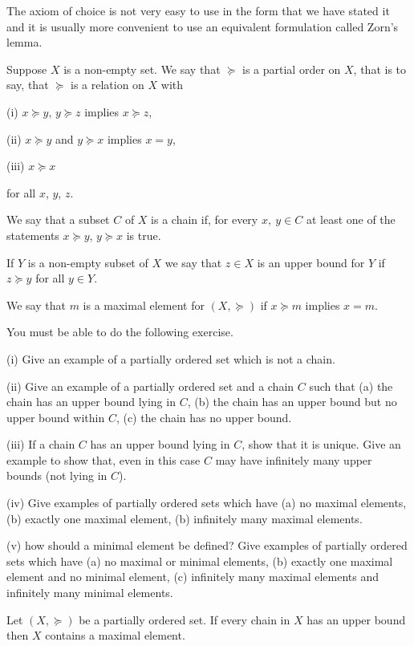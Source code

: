The axiom of choice is not very easy to use in the form
that we have stated it and it is usually more convenient
to use an equivalent formulation called Zorn's lemma.
\begin{definition} Suppose $X$ is a non-empty set.
We say that
$\succeq$ is a partial order on $X$, that is to say,
that $\succeq$ is a relation on $X$ with

(i) $x\succeq y$, $y\succeq z$ implies $x\succeq z$,

(ii) $x\succeq y$ and $y\succeq x$ implies $x=y$,

(iii) $x\succeq x$

\noindent for all $x$, $y$, $z$.

We say that a subset $C$ of $X$ is a chain
if, for every $x,\ y\in C$ at least one of
the statements $x\succeq y$, $y\succeq x$ is true.

If $Y$ is a non-empty subset of $X$ we say that $z\in X$
is an upper bound for $Y$ if $z\succeq y$ for all $y\in Y$.

We say that $m$ is a maximal element for $(X,\succeq)$
if $x\succeq m$ implies $x=m$.
\end{definition}
You must be able to do the following exercise.
\begin{exercise} (i) Give an example of a partially
ordered set which is not a chain.

(ii) Give an example of a partially ordered set
and a chain $C$ such that (a) the chain has an upper bound
lying in $C$, (b) the chain has an upper bound but no
upper bound within $C$, (c) the chain has no upper bound.

(iii) If a chain $C$ has an upper bound lying in $C$,
show that it is unique. Give an example to show that,
even in this case $C$ may have infinitely many
upper bounds (not lying in $C$).

(iv) Give examples of partially ordered sets
which have (a) no maximal elements, (b) exactly one
maximal element, (b) infinitely many maximal elements.

(v) how should a minimal element be defined?
Give examples of partially ordered sets
which have (a) no maximal or minimal elements, (b) exactly one
maximal element and no minimal element, 
(c) infinitely many maximal elements and infinitely many minimal
elements.
\end{exercise}
\begin{axiom} Let $(X,\succeq)$ be
a partially ordered set. If every chain in $X$ has
an upper bound then $X$ contains a maximal element.
\end{axiom}

